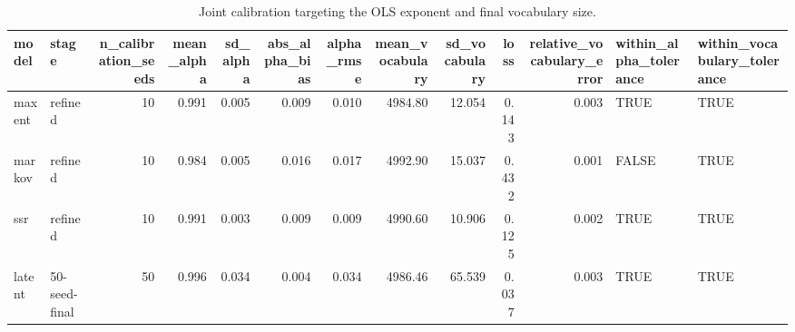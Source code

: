 \begin{table}

\caption{\label{tab:calibration-joint-table}Joint calibration targeting the OLS exponent and final vocabulary size.}
\centering
\begin{tabular}[t]{llrrrrrrrrrll}
\toprule
model & stage & n\_calibration\_seeds & mean\_alpha & sd\_alpha & abs\_alpha\_bias & alpha\_rmse & mean\_vocabulary & sd\_vocabulary & loss & relative\_vocabulary\_error & within\_alpha\_tolerance & within\_vocabulary\_tolerance\\
\midrule
maxent & refined & 10 & 0.991 & 0.005 & 0.009 & 0.010 & 4984.80 & 12.054 & 0.143 & 0.003 & TRUE & TRUE\\
markov & refined & 10 & 0.984 & 0.005 & 0.016 & 0.017 & 4992.90 & 15.037 & 0.432 & 0.001 & FALSE & TRUE\\
ssr & refined & 10 & 0.991 & 0.003 & 0.009 & 0.009 & 4990.60 & 10.906 & 0.125 & 0.002 & TRUE & TRUE\\
latent & 50-seed-final & 50 & 0.996 & 0.034 & 0.004 & 0.034 & 4986.46 & 65.539 & 0.037 & 0.003 & TRUE & TRUE\\
\bottomrule
\end{tabular}
\end{table}
